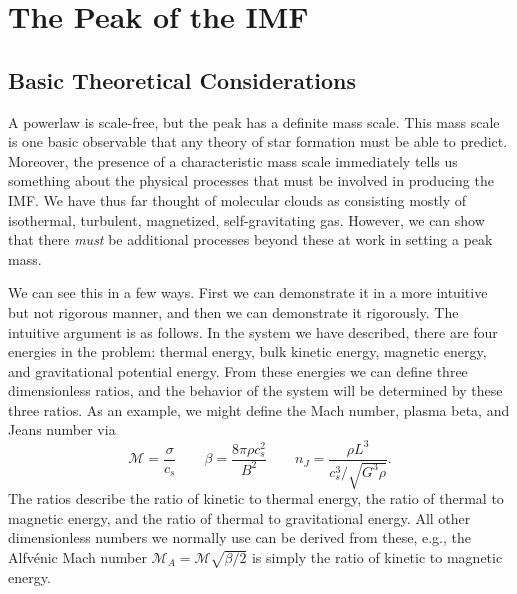 \section{The Peak of the IMF}
\label{sec:imfpeak}

\subsection{Basic Theoretical Considerations}

A powerlaw is scale-free, but the peak has a definite mass scale. This mass scale is one basic observable that any theory of star formation must be able to predict. Moreover, the presence of a characteristic mass scale immediately tells us something about the physical processes that must be involved in producing the IMF. We have thus far thought of molecular clouds as consisting mostly of isothermal, turbulent, magnetized, self-gravitating gas. However, we can show that there \textit{must} be additional processes beyond these at work in setting a peak mass.

We can see this in a few ways. First we can demonstrate it in a more intuitive but not rigorous manner, and then we can demonstrate it rigorously. The intuitive argument is as follows. In the system we have described, there are four energies in the problem: thermal energy, bulk kinetic energy, magnetic energy, and gravitational potential energy. From these energies we can define three dimensionless ratios, and the behavior of the system will be determined by these three ratios. As an example, we might define the Mach number, plasma beta, and Jeans number via
\begin{equation}
\mathcal{M} = \frac{\sigma}{c_s} \qquad \beta = \frac{8\pi \rho c_s^2}{B^2}
\qquad n_J = \frac{\rho L^3}{c_s^3/\sqrt{G^3\rho}}.
\end{equation}
The ratios describe the ratio of kinetic to thermal energy, the ratio of thermal to magnetic energy, and the ratio of thermal to gravitational energy. All other dimensionless numbers we normally use can be derived from these, e.g., the Alfv\'enic Mach number $\mathcal{M}_A = \mathcal{M}\sqrt{\beta/2}$ is simply the ratio of kinetic to magnetic energy.


